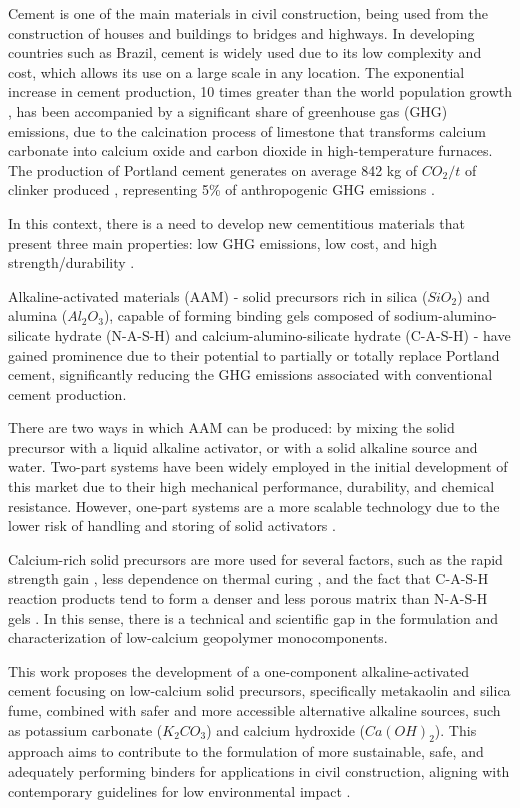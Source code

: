 Cement is one of the main materials in civil construction, being used from the construction of houses and buildings to bridges and highways.
In developing countries such as Brazil, cement is widely used due to its low complexity and cost, which allows its use on a large scale in any location.
The exponential increase in cement production, 10 times greater than the world population growth \cite{united1995world}, has been accompanied by a significant share of greenhouse gas (GHG) emissions, due to the calcination process of limestone that transforms calcium carbonate into calcium oxide and carbon dioxide in high-temperature furnaces.
The production of Portland cement generates on average 842 kg of $CO_2/t$ of clinker produced \cite{andrew2018global}, representing 5\% of anthropogenic GHG emissions \cite{IEA_WBCSD_2009}.

In this context, there is a need to develop new cementitious materials that present three main properties: low GHG emissions, low cost, and high strength/durability \cite{scrivener2018eco}.

Alkaline-activated materials (AAM) - solid precursors rich in silica ($SiO_2$) and alumina ($Al_2O_3$), capable of forming binding gels composed of sodium-alumino-silicate hydrate (N-A-S-H) and calcium-alumino-silicate hydrate (C-A-S-H) - have gained prominence due to their potential to partially or totally replace Portland cement, significantly reducing the GHG emissions associated with conventional cement production.

There are two ways in which AAM can be produced: by mixing the solid precursor with a liquid alkaline activator, or with a solid alkaline source and water.
Two-part systems have been widely employed in the initial development of this market due to their high mechanical performance, durability, and chemical resistance.
However, one-part systems are a more scalable technology due to the lower risk of handling and storing of solid activators \cite{provis2018alkali}.

Calcium-rich solid precursors are more used for several factors, such as the rapid strength gain \cite{provis2014geopolymers}, less dependence on thermal curing \cite{ke2021one}, and the fact that C-A-S-H reaction products tend to form a denser and less porous matrix than N-A-S-H gels \cite{bernal2014engineering}.
In this sense, there is a technical and scientific gap in the formulation and characterization of low-calcium geopolymer monocomponents.

This work proposes the development of a one-component alkaline-activated cement focusing on low-calcium solid precursors, specifically metakaolin and silica fume, combined with safer and more accessible alternative alkaline sources, such as potassium carbonate ($K_2CO_3$) and calcium hydroxide ($Ca(OH)_2$).
This approach aims to contribute to the formulation of more sustainable, safe, and adequately performing binders for applications in civil construction, aligning with contemporary guidelines for low environmental impact \cite{PNRS2016}.